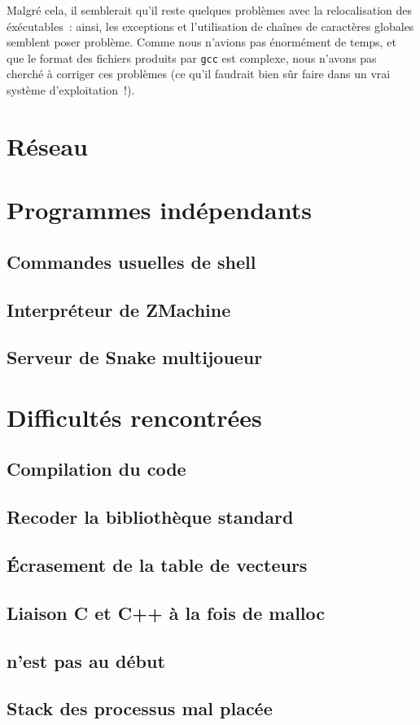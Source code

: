 \documentclass[11pt,a4paper]{article}
\newcommand{\todo}[1]{\colorbox{orange}{\color{blue}{\Large TODO:} #1}}
\begin{document}
Malgré cela, il semblerait qu'il reste quelques problèmes avec la
relocalisation des éxécutables~: ainsi, les exceptions et
l'utilisation de chaînes de caractères globales semblent poser
problème. Comme nous n'avions pas énormément de temps, et que le
format des fichiers produits par \texttt{gcc} est complexe, nous
n'avons pas cherché à corriger ces problèmes (ce qu'il faudrait bien
sûr faire dans un vrai système d'exploitation~!).

\section{Réseau}

\section{Programmes indépendants}

\subsection{Commandes usuelles de shell}
\subsection{Interpréteur de ZMachine}
\subsection{Serveur de Snake multijoueur}

\section{Difficultés rencontrées}

\subsection{Compilation du code}\label{ssec:diff:compil}
\todo{}
\subsection{Recoder la bibliothèque standard}\label{ssec:diff:stdlib}
\todo{}
\subsection{Écrasement de la table de vecteurs}\label{ssec:diff:delvect}
\todo{}
\subsection{Liaison C et C++ à la fois de malloc}\label{ssec:diff:linkage}
\todo{}
\subsection{ n'est pas au début}\label{ssec:diff:startup}
\todo{}
\subsection{Stack des processus mal placée}\label{ssec:diff:async_stack}
\todo{}
\end{document}
